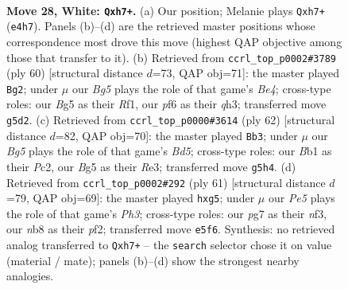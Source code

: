 \documentclass[11pt]{article}
\begin{document}
\clearpage

\begin{figure}[p]\centering
\begin{subfigure}{0.46\textwidth}\centering
\resizebox{\linewidth}{!}{%
\newchessgame
\chessboard[
  setfen={rn1rq1k1/pp4pp/5p2/2P1P1B1/4Q3/P5P1/1P3P2/1BR1R1K1 w - - 0 28},
  showmover=false,
  pgfstyle=straightmove, color=movearrow, markmove={e4-h7}
]}
\caption{}
\end{subfigure}\hfill
\begin{subfigure}{0.46\textwidth}\centering
\resizebox{\linewidth}{!}{%
\newchessgame
\chessboard[
  setfen={5r1k/1p4p1/p1np3r/2p2p2/2P1BQ2/1P1P2Bq/P7/1R3RK1 w - - 6 31},
  showmover=false,
  pgfstyle=straightmove, color=movearrow, markmove={e4-g2}
]}
\caption{}
\end{subfigure}
\\[4pt]
\begin{subfigure}{0.46\textwidth}\centering
\resizebox{\linewidth}{!}{%
\newchessgame
\chessboard[
  setfen={1k2r3/pp1n1pp1/3rp3/3B2q1/4Q1P1/P3R2P/1PP5/1K2R3 w - - 0 32},
  showmover=false,
  pgfstyle=straightmove, color=movearrow, markmove={d5-b3}
]}
\caption{}
\end{subfigure}\hfill
\begin{subfigure}{0.46\textwidth}\centering
\resizebox{\linewidth}{!}{%
\newchessgame
\chessboard[
  setfen={5rk1/3bqr2/2p2b1p/2Pp1pP1/QR6/4PNP1/5PB1/2R3K1 b - - 0 31},
  showmover=false,
  pgfstyle=straightmove, color=movearrow, markmove={h6-g5}
]}
\caption{}
\end{subfigure}
\caption{\textbf{Move 28, White: \texttt{Qxh7+}.} (a) Our position; Melanie plays \texttt{Qxh7+} (\texttt{e4h7}). Panels (b)--(d) are the retrieved master positions whose correspondence most drove this move (highest QAP objective among those that transfer to it). (b) Retrieved from \texttt{ccrl\_top\_p0002\#3789} (ply 60) [structural distance $d$=73, QAP obj=71]: the master played \texttt{Bg2}; under $\mu$ our \emph{Bg5} plays the role of that game's \emph{Be4}; cross-type roles: our \emph{B}g5 as their \emph{R}f1, our \emph{p}f6 as their \emph{q}h3; transferred move \texttt{g5d2}. (c) Retrieved from \texttt{ccrl\_top\_p0000\#3614} (ply 62) [structural distance $d$=82, QAP obj=70]: the master played \texttt{Bb3}; under $\mu$ our \emph{Bg5} plays the role of that game's \emph{Bd5}; cross-type roles: our \emph{B}b1 as their \emph{P}c2, our \emph{B}g5 as their \emph{R}e3; transferred move \texttt{g5h4}. (d) Retrieved from \texttt{ccrl\_top\_p0002\#292} (ply 61) [structural distance $d$=79, QAP obj=69]: the master played \texttt{hxg5}; under $\mu$ our \emph{Pe5} plays the role of that game's \emph{Ph3}; cross-type roles: our \emph{p}g7 as their \emph{n}f3, our \emph{n}b8 as their \emph{p}f2; transferred move \texttt{e5f6}. Synthesis: no retrieved analog transferred to \texttt{Qxh7+} -- the \texttt{search} selector chose it on value (material / mate); panels (b)--(d) show the strongest nearby analogies.}
\label{fig:thought-m54}
\end{figure}
\end{document}
